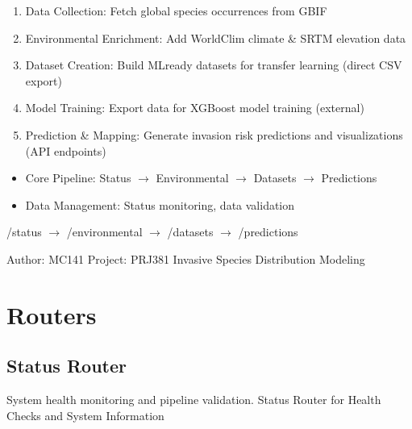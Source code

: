 \documentclass[letterpaper,10pt,english]{sphinxmanual}
\begin{document}
\begin{description}
\begin{enumerate}
%
\item {} 
\sphinxAtStartPar
Data Collection: Fetch global species occurrences from GBIF

\item {} 
\sphinxAtStartPar
Environmental Enrichment: Add WorldClim climate \& SRTM elevation data

\item {} 
\sphinxAtStartPar
Dataset Creation: Build ML\sphinxhyphen{}ready datasets for transfer learning (direct CSV export)

\item {} 
\sphinxAtStartPar
Model Training: Export data for XGBoost model training (external)

\item {} 
\sphinxAtStartPar
Prediction \& Mapping: Generate invasion risk predictions and visualizations (API endpoints)

\end{enumerate}

\begin{itemize}
\item {} 
\sphinxAtStartPar
Core Pipeline: Status \(\rightarrow\) Environmental \(\rightarrow\) Datasets \(\rightarrow\) Predictions

\item {} 
\sphinxAtStartPar
Data Management: Status monitoring, data validation

\end{itemize}

\sphinxAtStartPar
/status \(\rightarrow\) /environmental \(\rightarrow\) /datasets \(\rightarrow\) /predictions

\end{description}

\sphinxAtStartPar
Author: MC141
Project: PRJ381 \sphinxhyphen{} Invasive Species Distribution Modeling


\section{Routers}
\label{\detokenize{api_reference:routers}}

\subsection{Status Router}
\label{\detokenize{api_reference:status-router}}
\sphinxAtStartPar
System health monitoring and pipeline validation.
\label{\detokenize{api_reference:module-app.routers.status}}
\sphinxAtStartPar
Status Router for Health Checks and System Information
\end{document}
